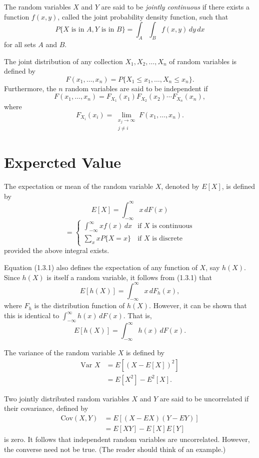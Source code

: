 \documentclass[lang=cn,10pt,thmcnt=section]{elegantbook}
\begin{document}
The random variables \(X\) and \(Y\) are said to be \textit{jointly continuous} if there exists a function \(f(x, y)\), called the joint probability density function, such that
\[
P\{X \text{ is in } A, Y \text{ is in } B\} = \int_A \int_B f(x, y) \, dy \, dx
\]
for all sets \(A\) and \(B\).

The joint distribution of any collection \(X_1, X_2, \ldots, X_n\) of random variables is defined by
\[
F(x_1, \ldots, x_n) = P\{X_1 \leq x_1, \ldots, X_n \leq x_n\}.
\]
Furthermore, the \(n\) random variables are said to be independent if
\[
F(x_1, \ldots, x_n) = F_{X_1}(x_1) F_{X_2}(x_2) \cdots F_{X_n}(x_n),
\]
where
\[
F_{X_i}(x_i) = \lim_{\substack{x_j \to \infty \\ j \neq i}} F(x_1, \ldots, x_n).
\]
\section{Expercted Value}
The expectation or mean of the random variable \(X\), denoted by \(E[X]\), is defined by
\begin{equation}
E[X] = \int_{-\infty}^{\infty} x \, dF(x)
\end{equation}
\[
= \begin{cases} 
\int_{-\infty}^{\infty} x f(x) \, dx & \text{if } X \text{ is continuous} \\
\sum_{x} x P\{X = x\} & \text{if } X \text{ is discrete}
\end{cases}
\]
provided the above integral exists.

Equation (1.3.1) also defines the expectation of any function of \(X\), say \(h(X)\). Since \(h(X)\) is itself a random variable, it follows from (1.3.1) that
\begin{equation}
E[h(X)] = \int_{-\infty}^{\infty} x \, dF_h(x),
\end{equation}
where \(F_h\) is the distribution function of \(h(X)\). However, it can be shown that this is identical to \(\int_{-\infty}^{\infty} h(x) \, dF(x)\). That is,
\begin{equation}
E[h(X)] = \int_{-\infty}^{\infty} h(x) \, dF(x).
\end{equation}

The variance of the random variable \(X\) is defined by
\begin{align*}
\text{Var } X &= E[(X - E[X])^2] \\
&= E[X^2] - E^2[X].
\end{align*}

Two jointly distributed random variables \(X\) and \(Y\) are said to be uncorrelated if their covariance, defined by
\begin{align*}
\text{Cov}(X, Y) &= E[(X - EX)(Y - EY)] \\
&= E[XY] - E[X]E[Y]
\end{align*}
is zero. It follows that independent random variables are uncorrelated. However, the converse need not be true. (The reader should think of an example.)
\end{document}
